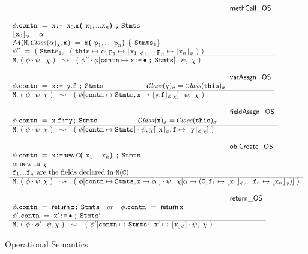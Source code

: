 \begin{figure*}
$\begin{array}{l}
\inferenceruleNN {methCall\_OS} {
\\
\phi.\prg{contn}\ =\ \x {\kw{:= }} \x_0.\m \lp \x_1, ... \x_n \rp \semi \prg{Stmts}
\\
\interp{\x_0}{\phi} = \alpha
\\
\Meths {} {\ClassOf {\alpha} {\chi}} {\m} \  =  \ \m\lp \p_1, \ldots \p_n \rp \lb \prg{Stmts}_1   \rb
  \\
 \phi''\ =\  (\  \prg{Stmts}_1,\ \ (\ \this \mapsto \alpha,
  \p_1 \mapsto  \interp{\x_1}{\phi}, \ldots \p_n \mapsto  \interp{\x_n}{\phi}\ ) \ )
}
{
 \M,\, (\ \phi\cdot\psi,\ \chi\ )\ \ \leadsto\  \ (\ \phi''\cdot\phi[\prg{contn}\mapsto\x  \kw{:=} \bullet \semi \prg{Stmts}] \cdot\psi,\ \chi\ )
}

\\ \\
\inferenceruleNN {varAssgn\_OS} {
 \phi.\prg{contn} \ = \ \x  {\kw{:= }}  \y.\f \ \semi \prg{Stmts}\ \hspace{2cm} \ClassOf {\y} {\sigma} =\ClassOf {\this} {\sigma}
}
{
 \M,\,  (\ \phi\cdot\psi, \chi\ )\ \ \leadsto\  \ (\ \phi[ \prg{contn} \mapsto \prg{Stmts}, \x\mapsto \interp{\y.\f}{\phi,\chi}] \cdot\psi,\ \chi\  )
}
\\
\\
\inferenceruleNN{fieldAssgn\_OS} {
 \phi.\prg{contn}\ =\  \x.\f  \kw{:=} \y  \semi \prg{Stmts} \hspace{2cm} \ClassOf {\x} {\sigma} =\ClassOf {\this} {\sigma}
}
{
 \M,\,  (\ \phi\cdot\psi, \chi\  )\ \ \leadsto\  \ (\ \phi[\prg{contn}\mapsto  \prg{Stmts} ] \cdot\psi, \chi[\interp{\x}{\phi},\f \mapsto \interp{\y}{\phi,\chi}]\  )
}
\\
\\
\inferenceruleNN {objCreate\_OS} {
 \phi.\prg{contn}\ =\  \x  \kw{:=} \kwN{new }\, \c \lp \x_1, ... \x_n \rp  \semi \prg{Stmts}
 \\
 \alpha\ \mbox{new in}\ \chi
 \\
\f_1, .. \f_n\ \mbox{are the fields declared in } \M(\c)
}
{
 \M,\,  (\ \phi\cdot\psi, \chi\ )\ \ \leadsto\  \ (\ \phi[\prg{contn}\mapsto  \prg{Stmts},\x \mapsto \alpha\ ] \cdot\psi, \ \chi[\alpha \mapsto (\c,\f_1 \mapsto \interp{\x_1}{\phi},  ... \f_n \mapsto \interp{\x_n}{\phi}  ) ]\ )
}
\\
\\
\inferenceruleNN {return\_OS} {
 \phi.\prg{contn}\ =\   {\kwN{return }}\, \x  \semi \prg{Stmts}\ \  \ or\  \ \  \phi.\prg{contn}\ =\   {\kwN{return}}\, \x
 \\
\phi'.\prg{contn}\ =\  \x' \kw{:=} \bullet  \semi \prg{Stmts}'
}
{
 \M,\,  (\ \phi\cdot\phi'\cdot\psi, \chi\ )\ \ \leadsto\  \ (\ \phi'[\prg{contn}\mapsto  \prg{Stmts'},\x' \mapsto \interp{\x}{\phi}] \cdot\psi, \ \chi \ )
}
\end{array}
$
\caption{Operational Semantics}
\label{fig:Execution}
\end{figure*}

